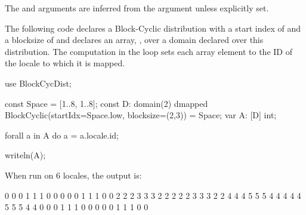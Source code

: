 
The  and  arguments are inferred from the
 argument unless explicitly set.

\begin{example}
The following code declares a Block-Cyclic distribution with a start index
of  and a blocksize of  and declares an array, , over a domain
declared over this distribution.  The computation in the 
loop sets each array element to the ID of the locale to which it is
mapped.
\begin{chapel}
use BlockCycDist;

const Space = [1..8, 1..8];
const D: domain(2) dmapped BlockCyclic(startIdx=Space.low, 
                                       blocksize=(2,3)) 
       = Space;
var A: [D] int;

forall a in A do
  a = a.locale.id;

writeln(A);
\end{chapel}
When run on 6 locales, the output is:
\begin{chapel}
0 0 0 1 1 1 0 0
0 0 0 1 1 1 0 0
2 2 2 3 3 3 2 2
2 2 2 3 3 3 2 2
4 4 4 5 5 5 4 4
4 4 4 5 5 5 4 4
0 0 0 1 1 1 0 0
0 0 0 1 1 1 0 0
\end{chapel}
\end{example}
